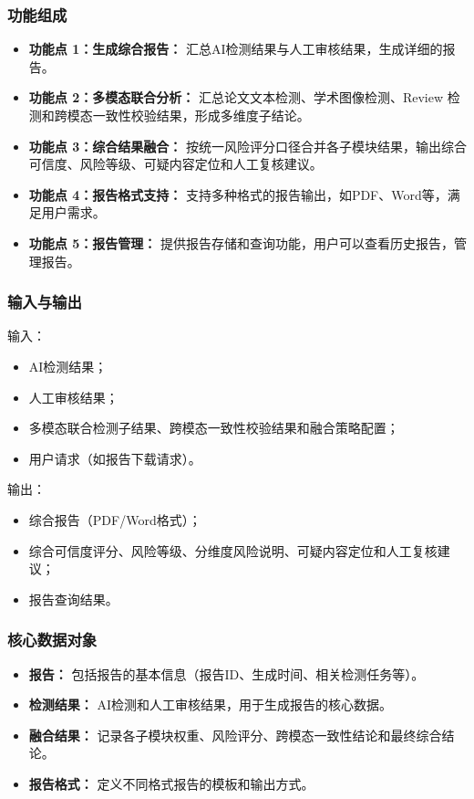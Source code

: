 \subsubsection{功能组成}
\begin{itemize}[leftmargin=2em]
    \item \textbf{功能点 1：生成综合报告：} 汇总AI检测结果与人工审核结果，生成详细的报告。
    \item \textbf{功能点 2：多模态联合分析：} 汇总论文文本检测、学术图像检测、Review 检测和跨模态一致性校验结果，形成多维度子结论。
    \item \textbf{功能点 3：综合结果融合：} 按统一风险评分口径合并各子模块结果，输出综合可信度、风险等级、可疑内容定位和人工复核建议。
    \item \textbf{功能点 4：报告格式支持：} 支持多种格式的报告输出，如PDF、Word等，满足用户需求。
    \item \textbf{功能点 5：报告管理：} 提供报告存储和查询功能，用户可以查看历史报告，管理报告。
\end{itemize}

\subsubsection{输入与输出}
输入：
\begin{itemize}[leftmargin=2em]
   \item AI检测结果；
   \item 人工审核结果；
   \item 多模态联合检测子结果、跨模态一致性校验结果和融合策略配置；
   \item 用户请求（如报告下载请求）。
\end{itemize}

输出：
\begin{itemize}[leftmargin=2em]
    \item 综合报告（PDF/Word格式）；
    \item 综合可信度评分、风险等级、分维度风险说明、可疑内容定位和人工复核建议；
    \item 报告查询结果。
\end{itemize}

\subsubsection{核心数据对象}
\begin{itemize}[leftmargin=2em]
    \item \textbf{报告：} 包括报告的基本信息（报告ID、生成时间、相关检测任务等）。
    \item \textbf{检测结果：} AI检测和人工审核结果，用于生成报告的核心数据。
    \item \textbf{融合结果：} 记录各子模块权重、风险评分、跨模态一致性结论和最终综合结论。
    \item \textbf{报告格式：} 定义不同格式报告的模板和输出方式。
\end{itemize}

